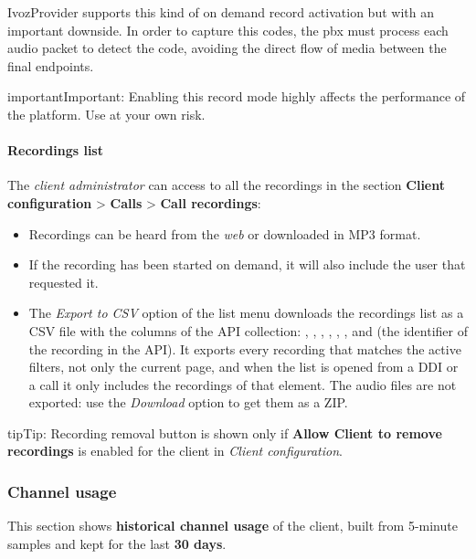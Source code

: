\documentclass[letterpaper,10pt,english]{sphinxmanual}
\begin{document}
IvozProvider supports this kind of on demand record activation but with an
important downside. In order to capture this codes, the pbx must process each
audio packet to detect the code, avoiding the direct flow of media between the
final endpoints.

\begin{notice}{important}{Important:}
Enabling this record mode highly affects the performance of the
platform. Use at your own risk.
\end{notice}


\paragraph{Recordings list}
\label{administration_portal/client/retail/calls/call_recordings:recordings-list}
The \emph{client administrator} can access to all the recordings in the section
\textbf{Client configuration} \textgreater{} \textbf{Calls} \textgreater{} \textbf{Call recordings}:
\begin{itemize}
\item {} 
Recordings can be heard from the \emph{web} or downloaded in MP3 format.

\item {} 
If the recording has been started on demand, it will also include the user
that requested it.

\item {} 
The \emph{Export to CSV} option of the list menu downloads the recordings list as a CSV file with the
columns of the API collection: , , , , ,
,  and  (the identifier of the recording in the API).
It exports every recording that matches the active filters, not only the current page, and
when the list is opened from a DDI or a call it only includes the recordings of that element.
The audio files are not exported: use the \emph{Download} option to get them as a ZIP.

\end{itemize}

\begin{notice}{tip}{Tip:}
Recording removal button is shown only if \textbf{Allow Client to remove recordings} is enabled
for the client in \emph{Client configuration}.
\end{notice}


\subsubsection{Channel usage}
\label{administration_portal/client/retail/calls/channel_usage:channel-usage}\label{administration_portal/client/retail/calls/channel_usage::doc}
This section shows \textbf{historical channel usage} of the client, built from 5-minute samples and kept for the last
\textbf{30 days}.
\end{document}
